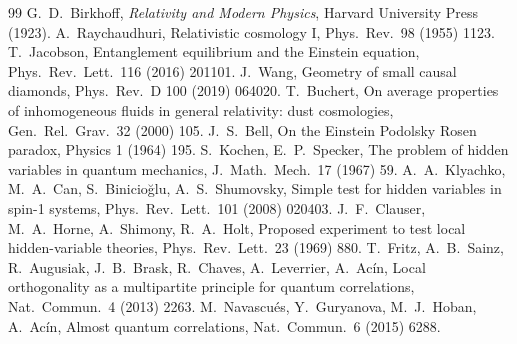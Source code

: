 \documentclass[11pt]{article}
\theoremstyle{definition}
\theoremstyle{remark}
\begin{document}
\begin{thebibliography}{99}
 G.~D.~Birkhoff, \emph{Relativity and Modern Physics}, Harvard University Press (1923).
 A.~Raychaudhuri, Relativistic cosmology I, Phys.\ Rev.\ 98 (1955) 1123.
 T.~Jacobson, Entanglement equilibrium and the Einstein equation, Phys.\ Rev.\ Lett.\ 116 (2016) 201101.
 J.~Wang, Geometry of small causal diamonds, Phys.\ Rev.\ D 100 (2019) 064020.
 T.~Buchert, On average properties of inhomogeneous fluids in general relativity: dust cosmologies, Gen.\ Rel.\ Grav.\ 32 (2000) 105.
 J.~S.~Bell, On the Einstein Podolsky Rosen paradox, Physics 1 (1964) 195.
 S.~Kochen, E.~P.~Specker, The problem of hidden variables in quantum mechanics, J.\ Math.\ Mech.\ 17 (1967) 59.
 A.~A.~Klyachko, M.~A.~Can, S.~Binicio\u{g}lu, A.~S.~Shumovsky, Simple test for hidden variables in spin-1 systems, Phys.\ Rev.\ Lett.\ 101 (2008) 020403.
 J.~F.~Clauser, M.~A.~Horne, A.~Shimony, R.~A.~Holt, Proposed experiment to test local hidden-variable theories, Phys.\ Rev.\ Lett.\ 23 (1969) 880.
 T.~Fritz, A.~B.~Sainz, R.~Augusiak, J.~B.~Brask, R.~Chaves, A.~Leverrier, A.~Ac\'in, Local orthogonality as a multipartite principle for quantum correlations, Nat.\ Commun.\ 4 (2013) 2263.
 M.~Navascu\'es, Y.~Guryanova, M.~J.~Hoban, A.~Ac\'in, Almost quantum correlations, Nat.\ Commun.\ 6 (2015) 6288.

\end{thebibliography}
\end{document}
